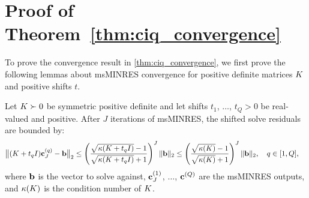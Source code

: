\section{Proof of Theorem~\ref{thm:ciq_convergence}}
\label{app:ciq_proofs}

To prove the convergence result in \cref{thm:ciq_convergence}, we first prove the following lemmas about msMINRES convergence for positive definite matrices $K$ and positive shifts $t$.

\begin{lemma}
  Let $K \succ 0$ be symmetric positive definite and let shifts $t_1$, $\ldots$, $t_Q > 0$ be real-valued and positive.
  After $J$ iterations of msMINRES, the shifted solve residuals are bounded by:
  \begin{align*}
    \bigl\Vert (K + t_q I) \mathbf{c}_J^{(q)} - \mathbf{b} \bigr\Vert_2
    &\leq \left( \frac{
      \sqrt{\kappa(K + t_q I)} - 1
    }{
      \sqrt{\kappa(K + t_q I)} + 1
    }\right)^J
    \Vert \mathbf{b} \Vert_2
    \leq \left( \frac{
      \sqrt{\kappa(K)} - 1
    }{
      \sqrt{\kappa(K)} + 1
    }\right)^J
    \Vert \mathbf{b} \Vert_2,
    \quad
    q \in [1, Q],
	\end{align*}
  where $\mathbf{b}$ is the vector to solve against, $\mathbf{c}^{(1)}_J$, $\ldots$, $\mathbf{c}^{(Q)}$ are the msMINRES outputs, and $\kappa(K)$ is the condition number of $K$.
  \label{lemma:minres}
\end{lemma}
%
